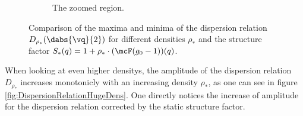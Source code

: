 \begin{figure}[H]
\begin{subfigure}[t]{\textwidth}
        \caption{The zoomed region.}
    \end{subfigure}
    \caption{Comparison of the maxima and minima of the dispersion relation $D_{\rho_*}(\dabs{\vq}{2})$ for different densities $\rho_*$ and the structure factor $S_*(q) = 1 + \rho_*\cdot(\mcF (g_0 - 1))(q)$.}
    \label{fig:DispersionRelationMinMax}
\end{figure}

When looking at even higher densitys, the amplitude of the dispersion relation $D_{\rho_*}$ increases monotonicly with an increasing density $\rho_*$, as one can see in figure \ref{fig:DispersionRelationHugeDens}. One directly notices the increase of amplitude for the dispersion relation corrected by the static structure factor.  

